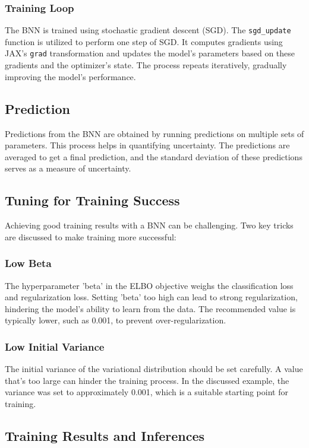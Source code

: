 \documentclass{article}
\begin{document}
\subsubsection{Training Loop}
The BNN is trained using stochastic gradient descent (SGD). The \texttt{sgd\_update} function is utilized to perform one step of SGD. It computes gradients using JAX's \texttt{grad} transformation and updates the model's parameters based on these gradients and the optimizer's state. The process repeats iteratively, gradually improving the model's performance.


\subsection{Prediction}
Predictions from the BNN are obtained by running predictions on multiple sets of parameters. This process helps in quantifying uncertainty. The predictions are averaged to get a final prediction, and the standard deviation of these predictions serves as a measure of uncertainty.

\subsection{Tuning for Training Success}
Achieving good training results with a BNN can be challenging. Two key tricks are discussed to make training more successful:

\subsubsection{Low Beta}
The hyperparameter 'beta' in the ELBO objective weighs the classification loss and regularization loss. Setting 'beta' too high can lead to strong regularization, hindering the model's ability to learn from the data. The recommended value is typically lower, such as 0.001, to prevent over-regularization.

\subsubsection{Low Initial Variance}
The initial variance of the variational distribution should be set carefully. A value that's too large can hinder the training process. In the discussed example, the variance was set to approximately 0.001, which is a suitable starting point for training.

\subsection{Training Results and Inferences}
\end{document}
